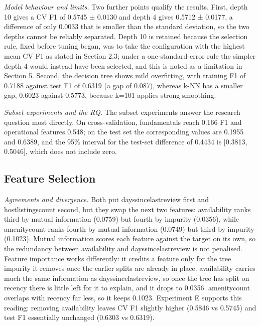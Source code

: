 \documentclass[final,1p,11pt]{elsarticle}
\renewcommand\_{\textunderscore\allowbreak}%
\begin{document}
\textit{Model behaviour and limits.} Two further points qualify the results. First, depth 10 gives a CV F1 of 0.5745 ± 0.0130 and depth 4 gives 0.5712 ± 0.0177, a difference of only 0.0033 that is smaller than the standard deviation, so the two depths cannot be reliably separated. Depth 10 is retained because the selection rule, fixed before tuning began, was to take the configuration with the highest mean CV F1 as stated in Section 2.3; under a one-standard-error rule the simpler depth 4 would instead have been selected, and this is noted as a limitation in Section 5. Second, the decision tree shows mild overfitting, with training F1 of 0.7188 against test F1 of 0.6319 (a gap of 0.087), whereas k-NN has a smaller gap, 0.6023 against 0.5773, because k=101 applies strong smoothing.

\textit{Subset experiments and the RQ.} The subset experiments answer the research question most directly. On cross-validation, fundamentals reach 0.166 F1 and operational features 0.548; on the test set the corresponding values are 0.1955 and 0.6389, and the 95\% interval for the test-set difference of 0.4434 is [0.3813, 0.5046], which does not include zero.

\subsection{Feature Selection}

\textit{Agreements and divergence.} Both put days\_since\_last\_review first and host\_listings\_count second, but they swap the next two features: availability\_365 ranks third by mutual information (0.0759) but fourth by impurity (0.0356), while amenity\_count ranks fourth by mutual information (0.0749) but third by impurity (0.1023). Mutual information scores each feature against the target on its own, so the redundancy between availability\_365 and days\_since\_last\_review is not penalised. Feature importance works differently: it credits a feature only for the tree impurity it removes once the earlier splits are already in place. availability\_365 carries much the same information as days\_since\_last\_review, so once the tree has split on recency there is little left for it to explain, and it drops to 0.0356. amenity\_count overlaps with recency far less, so it keeps 0.1023. Experiment E supports this reading: removing availability\_365 leaves CV F1 slightly higher (0.5846 vs 0.5745) and test F1 essentially unchanged (0.6303 vs 0.6319).
\end{document}
